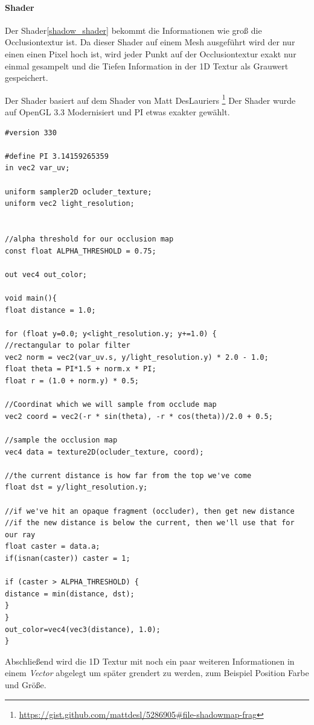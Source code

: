 \paragraph{Shader}
Der Shader\ref{shadow_shader} bekommt die Informationen wie groß die Occlusiontextur ist.
Da dieser Shader auf einem Mesh ausgeführt wird der nur einen einen Pixel hoch ist, wird jeder Punkt auf der Occlusiontextur exakt nur einmal gesampelt und die Tiefen Information in der 1D Textur als Grauwert gespeichert.

Der Shader basiert auf dem Shader von Matt DesLauriers \footnote{\url{https://gist.github.com/mattdesl/5286905\#file-shadowmap-frag}}
Der Shader wurde auf OpenGL 3.3 Modernisiert und PI etwas exakter gewählt.
\begin{lstlisting}[caption=Shadowmaper Shader,label=shadow_shader]
#version 330

#define PI 3.14159265359
in vec2 var_uv;

uniform sampler2D ocluder_texture;
uniform vec2 light_resolution;


//alpha threshold for our occlusion map
const float ALPHA_THRESHOLD = 0.75;

out vec4 out_color;

void main(){
float distance = 1.0;

for (float y=0.0; y<light_resolution.y; y+=1.0) {
//rectangular to polar filter
vec2 norm = vec2(var_uv.s, y/light_resolution.y) * 2.0 - 1.0;
float theta = PI*1.5 + norm.x * PI;
float r = (1.0 + norm.y) * 0.5;

//Coordinat which we will sample from occlude map
vec2 coord = vec2(-r * sin(theta), -r * cos(theta))/2.0 + 0.5;

//sample the occlusion map
vec4 data = texture2D(ocluder_texture, coord);

//the current distance is how far from the top we've come
float dst = y/light_resolution.y;

//if we've hit an opaque fragment (occluder), then get new distance
//if the new distance is below the current, then we'll use that for our ray
float caster = data.a;
if(isnan(caster)) caster = 1;

if (caster > ALPHA_THRESHOLD) {
distance = min(distance, dst);
}
}
out_color=vec4(vec3(distance), 1.0);
}
\end{lstlisting}

Abschließend wird die 1D Textur mit noch ein paar weiteren Informationen in einem \textit{Vector} abgelegt um später grendert zu werden, zum Beispiel Position Farbe und Größe.

